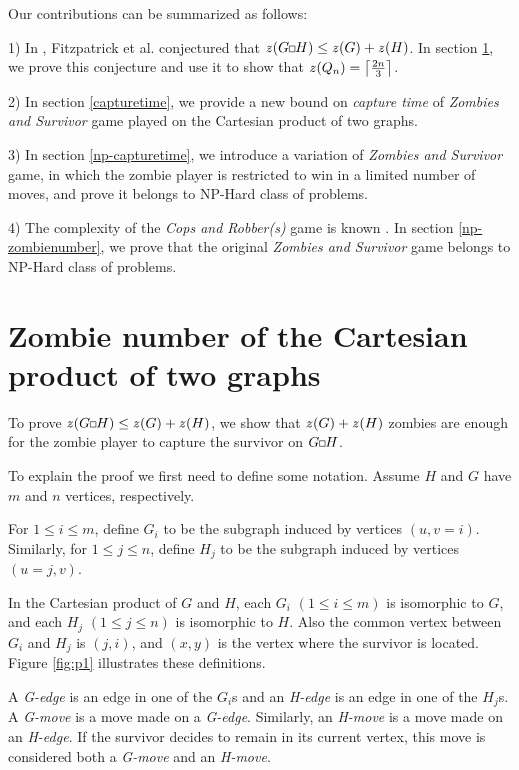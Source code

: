 \documentclass[1p]{elsarticle}
\DeclarePairedDelimiter\ceil{\lceil}{\rceil} \DeclarePairedDelimiter\floor{\lfloor}{\rfloor}
\newcommand{\zn}{\ooalign{$z$\cr\hfil\rule[.5ex]{.2em}{.08ex}\hfil\cr}}
\newcommand{\sq}[1][black]{%
\begin{tikzpicture}                                                           
  \draw[#1] (2pt,0pt) -- (6pt,0pt);   
  \draw[#1] (2pt,0pt) -- (2pt,4pt);    
  \draw[#1] (2pt,4pt) -- (6pt,4pt);   
  \draw[#1] (6pt,0pt) -- (6pt,4pt);
\end{tikzpicture}%
}
\begin{document}
Our contributions can be summarized as follows:

1) In \cite{Fitz16}, Fitzpatrick et al. conjectured that $\zn(G \sq H) \leq \zn(G) + \zn(H)$. In section \ref{conj-proof}, we prove this conjecture and
use it to show that $\zn(Q_n) = \ceil*{\frac{2n}{3}}$. 

2) In section \ref{capturetime}, we provide a new bound on {\it capture time} of {\it Zombies and Survivor} game played on the Cartesian
product of two graphs. 

3) In section \ref{np-capturetime}, we introduce a variation of {\it Zombies and Survivor} game, in which the zombie
player is restricted to win in a limited number of moves, and prove it belongs to NP-Hard class of problems.

4) The complexity of the {\it Cops and Robber(s)} game is known \cite{Kinnersley15}. In section \ref{np-zombienumber},
we prove that the original {\it Zombies and Survivor} game belongs to NP-Hard class of problems.


\section{Zombie number of the Cartesian product of two graphs}\label{conj-proof}

To prove $\zn(G \sq H) \leq \zn(G) + \zn(H)$, we show that $\zn(G) + \zn(H)$ zombies are enough for the zombie player to
capture the survivor on $G \sq H$.

To explain the proof we first need to define some notation. Assume $H$ and $G$ have $m$ and $n$ vertices,
respectively. 

For $1 \leq i \leq m$, define $G_i$ to be the subgraph induced by vertices $(u,v = i)$. Similarly, for $1 \leq j \leq
n$, define $H_{j}$ to be the subgraph induced by vertices $(u = j,v)$.

In the Cartesian product of $G$ and $H$, each $G_{i}$ $(1 \leq i \leq m)$ is isomorphic to $G$, and each $H_{j}$ $(1
\leq j \leq n)$ is isomorphic to $H$. Also the common vertex between $G_{i}$ and $H_{j}$ is $(j,i)$, and $(x,y)$ is the
vertex where the survivor is located. Figure \ref{fig:p1} illustrates these definitions.

A {\it G-edge} is an edge in one of the $G_{i}$s and an {\it H-edge} is an edge in one of the $H_{j}$s. A {\it G-move}
is a move made on a {\it G-edge}. Similarly, an {\it H-move} is a move made on an {\it H-edge}. If the survivor decides
to remain in its current vertex, this move is considered both a {\it G-move} and an {\it H-move}. 
\end{document}
